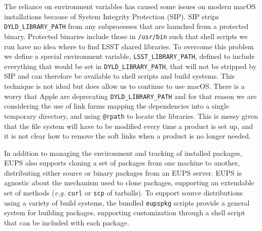 The reliance on environment variables has caused some issues on modern macOS installations because of System Integrity Protection (SIP).\cite{DMTN-001}
SIP strips \texttt{DYLD\_LIBRARY\_PATH} from any subprocesses that are launched from a protected binary.
Protected binaries include those in \texttt{/usr/bin} such that shell scripts we run have no idea where to find LSST shared libraries.
To overcome this problem we define a special environment variable, \texttt{LSST\_LIBRARY\_PATH}, defined to include everything that would be set in \texttt{DYLD\_LIBRARY\_PATH}, that will not be stripped by SIP and can therefore be available to shell scripts and build systems.
This technique is not ideal but does allow us to continue to use macOS.
There is a worry that Apple are deprecating \texttt{DYLD\_LIBRARY\_PATH} and for that reason we are considering the use of link farms mapping the dependencies into a single temporary directory, and using \texttt{@rpath} to locate the libraries.
This is messy given that the file system will have to be modified every time a product is set up, and it is not clear how to remove the soft links when a product is no longer needed.

In addition to managing the environment and tracking of installed packages, EUPS also supports cloning a set of packages from one machine to another, distributing either source or binary packages from an EUPS server.
EUPS is agnostic about the mechanism used to clone packages, supporting an extendable set of methods (\textit{e.g.} \texttt{curl} or \texttt{scp} of tarballs).
To support source distributions using a variety of build systems, the bundled \texttt{eupspkg} scripts provide a general system for building packages, supporting customization through a shell script that can be included with each package.
